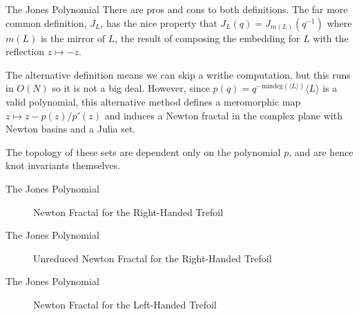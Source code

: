 \documentclass{beamer}
\begin{document}
    \begin{frame}{The Jones Polynomial}
        There are pros and cons to both definitions. The far more common
        definition, $J_{L}$, has the nice property that
        $J_{L}(q)=J_{m(L)}(q^{-1})$ where $m(L)$ is the mirror of $L$,
        the result of composing the embedding for $L$ with the
        reflection $z\mapsto{-z}$.
        \par\hfill\par
        The alternative definition means we can skip a writhe computation,
        but this runs in $O(N)$ so it is not a big deal. However, since
        $p(q)=q^{-\textrm{mindeg}(\langle{L}\rangle)}\langle{L}\rangle$ is a
        valid polynomial, this alternative method defines a
        meromorphic map $z\mapsto{z}-p(z)/p'(z)$ and induces a Newton fractal
        in the complex plane with Newton basins and a Julia set.
        \par\hfill\par
        The topology of these
        sets are dependent only on the polynomial $p$, and are hence knot
        invariants themselves.
    \end{frame}
    \begin{frame}{The Jones Polynomial}
        \begin{figure}
            \centering
            \caption{Newton Fractal for the Right-Handed Trefoil}
        \end{figure}
    \end{frame}
    \begin{frame}{The Jones Polynomial}
        \begin{figure}
            \centering
            \caption{Unreduced Newton Fractal for the Right-Handed Trefoil}
        \end{figure}
    \end{frame}
    \begin{frame}{The Jones Polynomial}
        \begin{figure}
            \centering
            \caption{Newton Fractal for the Left-Handed Trefoil}
        \end{figure}
    \end{frame}
\end{document}
